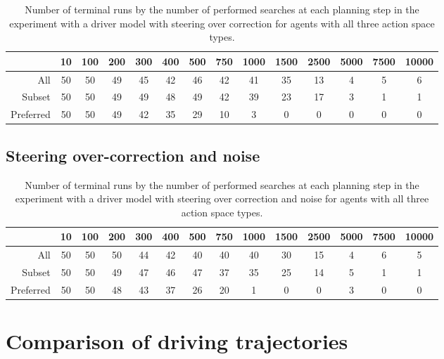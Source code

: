 

\begin{table}[htbp]
\footnotesize
\centering
\centerfloat
\begin{tabular}{@{}rccccccccccccc@{}}
\toprule
& 10 & 100 & 200 & 300 & 400 & 500 & 750 & 1000 & 1500 & 2500 & 5000 & 7500 & 10000 \\ \midrule
All       & 50 & 50  & 49  & 45  & 42  & 46  & 42  & 41   & 35   & 13   & 4    & 5    & 6     \\
Subset    & 50 & 50  & 49  & 49  & 48  & 49  & 42  & 39   & 23   & 17   & 3    & 1    & 1     \\
Preferred & 50 & 50  & 49  & 42  & 35  & 29  & 10  & 3    & 0    & 0    & 0    & 0    & 0     \\ \bottomrule
\end{tabular}
\caption{Number of terminal runs by the number of performed searches at each planning step in the experiment with a driver model with steering over correction for agents with all three action space types.}
\label{tab:simple_terminal}
\end{table}

\subsection{Steering over-correction and noise}



\begin{table}[htbp]
\footnotesize
\centering
\centerfloat
\begin{tabular}{@{}rccccccccccccc@{}}
\toprule
& 10 & 100 & 200 & 300 & 400 & 500 & 750 & 1000 & 1500 & 2500 & 5000 & 7500 & 10000 \\ \midrule
All       & 50 & 50  & 50  & 44  & 42  & 40  & 40  & 40   & 30   & 15   & 4    & 6    & 5     \\
Subset    & 50 & 50  & 49  & 47  & 46  & 47  & 37  & 35   & 25   & 14   & 5    & 1    & 1     \\
Preferred & 50 & 50  & 48  & 43  & 37  & 26  & 20  & 1    & 0    & 0    & 3    & 0    & 0     \\ \bottomrule
\end{tabular}
\caption{Number of terminal runs by the number of performed searches at each planning step in the experiment with a driver model with steering over correction and noise for agents with all three action space types.}
\label{tab:simple_terminal}
\end{table}

\section{Comparison of driving trajectories}




